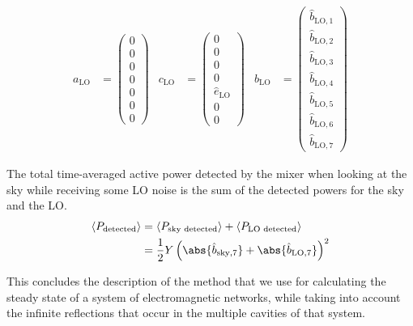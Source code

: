 \begin{align}
    a_\text{LO}
    &=
    \begin{pmatrix}
        0 \\ 0 \\ 0 \\ 0 \\ 0 \\ 0 \\ 0
    \end{pmatrix}
    &
    c_\text{LO}
    &=
    \begin{pmatrix}
        0 \\ 0 \\ 0 \\ 0 \\ \hat{e}_\text{LO} \\ 0 \\ 0
    \end{pmatrix}
    &
    b_\text{LO}
    &=
    \begin{pmatrix}
        \hat{b}_{\text{LO},1}\\
        \hat{b}_{\text{LO},2}\\
        \hat{b}_{\text{LO},3}\\
        \hat{b}_{\text{LO},4}\\
        \hat{b}_{\text{LO},5}\\
        \hat{b}_{\text{LO},6}\\
        \hat{b}_{\text{LO},7}
    \end{pmatrix}
    \label{eq:example_abc_LO}
\end{align}

The total time-averaged active power detected by the mixer when looking at the sky while receiving some LO noise is the sum of the detected powers for the sky and the LO.
\begin{align*}
    \langle P_\text{detected} \rangle
    &=
    \langle P_\text{sky detected}  \rangle + \langle P_\text{LO detected} \rangle
    \\
    &= \frac{1}{2} Y
       \left(
           \abs{\hat{b}_{\text{sky},7}}
           +
           \abs{\hat{b}_{\text{LO},7}}
       \right)^2
\end{align*}

This concludes the description of the method that we use for calculating the steady state of a system of electromagnetic networks, while taking into account the infinite reflections that occur in the multiple cavities of that system.


\clearpage
